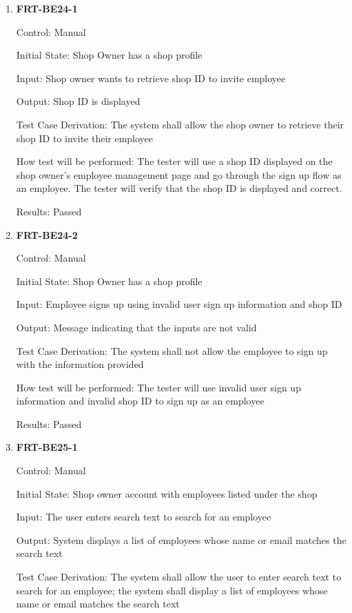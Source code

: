 \documentclass[12pt, titlepage]{article}
\begin{document}
\begin{enumerate}

	\item \textbf{FRT-BE24-1}

	      Control: Manual

	      Initial State: Shop Owner has a shop profile

	      Input: Shop owner wants to retrieve shop ID to invite employee

	      Output: Shop ID is displayed

	      Test Case Derivation: The system shall allow the shop owner to retrieve their shop ID to invite
	      their employee

	      How test will be performed: The tester will use a shop ID displayed on the shop owner's employee
	      management page and go through the sign up flow as an employee. The tester will verify that the
	      shop ID is displayed and correct.

	      Results: Passed

	\item \textbf{FRT-BE24-2}

	      Control: Manual

	      Initial State: Shop Owner has a shop profile

	      Input: Employee signs up using invalid user sign up information and shop ID

	      Output: Message indicating that the inputs are not valid

	      Test Case Derivation: The system shall not allow the employee to sign up with the information
	      provided

	      How test will be performed: The tester will use invalid user sign up information and invalid shop
	      ID to sign up as an employee

	      Results: Passed

	\item \textbf{FRT-BE25-1}

	      Control: Manual

	      Initial State: Shop owner account with employees listed under the shop

	      Input: The user enters search text to search for an employee

	      Output: System displays a list of employees whose name or email matches the search text

	      Test Case Derivation: The system shall allow the user to enter search text to search for an
	      employee; the system shall display a list of employees whose name or email matches the search text


\end{enumerate}
\end{document}

